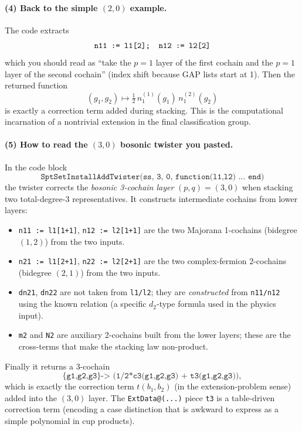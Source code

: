 \documentclass{SciPost}
\begin{document}
\paragraph{(4) Back to the simple $(2,0)$ example.}
The code extracts
\begin{equation}
	\texttt{n11 := l1[2];\quad n12 := l2[2]}
\end{equation}
which you should read as ``take the $p=1$ layer of the first cochain and the $p=1$ layer of the second cochain'' (index shift because GAP lists start at 1).
Then the returned function
\begin{equation}
(g_1,g_2)\mapsto \tfrac12\,n_{1}^{(1)}(g_1)\,n_{1}^{(2)}(g_2)
\end{equation}
is exactly a correction term added during stacking.
This is the computational incarnation of a nontrivial extension in the final classification group.

\paragraph{(5) How to read the $(3,0)$ bosonic twister you pasted.}
In the code block
\begin{equation}
	\texttt{SptSetInstallAddTwister(ss, 3, 0, function(l1,l2) ... end)}
\end{equation}
the twister corrects the \emph{bosonic 3-cochain layer} $(p,q)=(3,0)$ when stacking two total-degree-$3$ representatives.
It constructs intermediate cochains from lower layers:
\begin{itemize}
    \item \texttt{n11 := l1[1+1]}, \texttt{n12 := l2[1+1]} are the two Majorana 1-cochains (bidegree $(1,2)$) from the two inputs.
    \item \texttt{n21 := l1[2+1]}, \texttt{n22 := l2[2+1]} are the two complex-fermion 2-cochains (bidegree $(2,1)$) from the two inputs.
    \item \texttt{dn21}, \texttt{dn22} are not taken from \texttt{l1/l2}; they are \emph{constructed} from \texttt{n11/n12} using the known relation (a specific $d_2$-type formula used in the physics input).
    \item \texttt{m2} and \texttt{N2} are auxiliary 2-cochains built from the lower layers; these are the cross-terms that make the stacking law non-product.
\end{itemize}
Finally it returns a 3-cochain
\begin{equation}
	\texttt{\{g1,g2,g3\} -> (1/2*c3(g1,g2,g3) + t3(g1,g2,g3))},
\end{equation}
which is exactly the correction term $t(b_1,b_2)$ (in the extension-problem sense) added into the $(3,0)$ layer.
The \texttt{ExtData@(...)} piece \texttt{t3} is a table-driven correction term (encoding a case distinction that is awkward to express as a simple polynomial in cup products).
\end{document}
